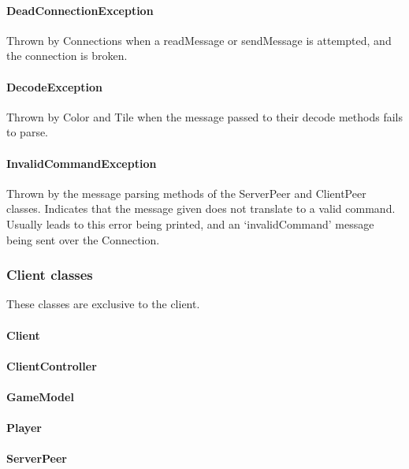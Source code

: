 \documentclass[12pt, letterpaper]{article}
\begin{document}
    \paragraph{DeadConnectionException}
    Thrown by Connections when a readMessage or sendMessage is attempted, and the connection is broken.

    \paragraph{DecodeException}
    Thrown by Color and Tile when the message passed to their decode methods fails to parse.

    \paragraph{InvalidCommandException}
    Thrown by the message parsing methods of the ServerPeer and ClientPeer classes.
    Indicates that the message given does not translate to a valid command.
    Usually leads to this error being printed, and an `invalidCommand' message being sent over the Connection.



    \subsubsection{Client classes}

    These classes are exclusive to the client.

    \paragraph{Client}

    \paragraph{ClientController}

    \paragraph{GameModel}

    \paragraph{Player}

    \paragraph{ServerPeer}
\end{document}
